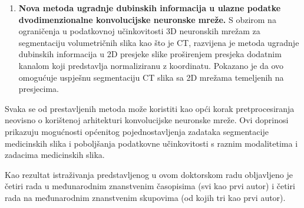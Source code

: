 \begin{enumerate}
	\item \textbf{Nova metoda ugradnje dubinskih informacija u ulazne podatke dvodimenzionalne konvolucijske neuronske mreže.} S obzirom na ograničenja u podatkovnoj učinkovitosti 3D neuronskih mrežam za segmentaciju volumetričnih slika kao što je CT, razvijena je metoda ugradnje dubinskih informacija u 2D presjeke slike proširenjem presjeka dodatnim kanalom koji predstavlja normaliziranu z koordinatu. Pokazano je da ovo omogućuje uspješnu segmentaciju CT slika sa 2D mrežama temeljenih na presjecima.
\end{enumerate}

Svaka se od prestavljenih metoda može koristiti kao opći korak pretprocesiranja neovisno o korištenoj arhitekturi konvolucijske neuronske mreže. Ovi doprinosi prikazuju mogućnosti općenitog pojednostavljenja zadataka segmentacije medicinskih slika i poboljšanja podatkovne učinkovitosti s raznim modalitetima i zadacima medicinskih slika.

Kao rezultat istraživanja predstavljenog u ovom doktorskom radu obljavljeno je četiri rada u međunarodnim znanstvenim časopisima (svi kao prvi autor) i četiri rada na međunarodnim znanstvenim skupovima (od kojih tri kao prvi autor).
